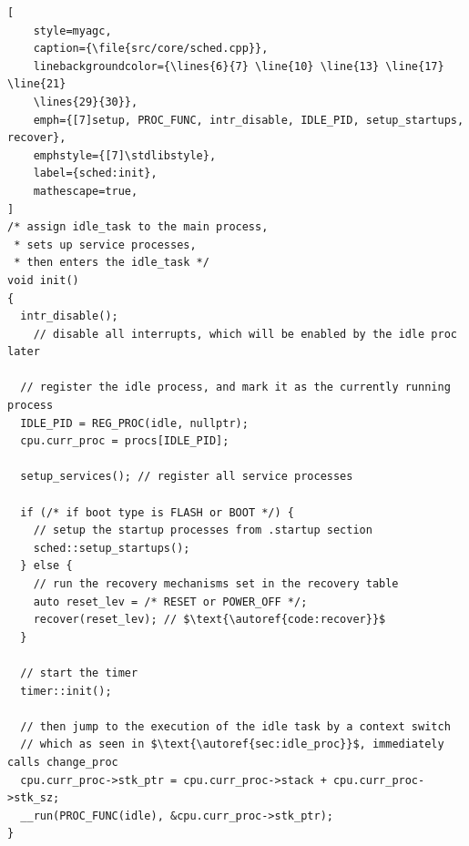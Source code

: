 \begin{lstlisting}[
    style=myagc,
    caption={\file{src/core/sched.cpp}},
    linebackgroundcolor={\lines{6}{7} \line{10} \line{13} \line{17} \line{21}
    \lines{29}{30}},
    emph={[7]setup, PROC_FUNC, intr_disable, IDLE_PID, setup_startups, recover},
    emphstyle={[7]\stdlibstyle},
    label={sched:init},
    mathescape=true,
]
/* assign idle_task to the main process, 
 * sets up service processes, 
 * then enters the idle_task */
void init()
{
  intr_disable(); 
    // disable all interrupts, which will be enabled by the idle proc later

  // register the idle process, and mark it as the currently running process
  IDLE_PID = REG_PROC(idle, nullptr);
  cpu.curr_proc = procs[IDLE_PID];

  setup_services(); // register all service processes

  if (/* if boot type is FLASH or BOOT */) {
    // setup the startup processes from .startup section
    sched::setup_startups();
  } else {
    // run the recovery mechanisms set in the recovery table
    auto reset_lev = /* RESET or POWER_OFF */;
    recover(reset_lev); // $\text{\autoref{code:recover}}$
  }

  // start the timer
  timer::init();

  // then jump to the execution of the idle task by a context switch
  // which as seen in $\text{\autoref{sec:idle_proc}}$, immediately calls change_proc
  cpu.curr_proc->stk_ptr = cpu.curr_proc->stack + cpu.curr_proc->stk_sz;
  __run(PROC_FUNC(idle), &cpu.curr_proc->stk_ptr);
}
\end{lstlisting}


